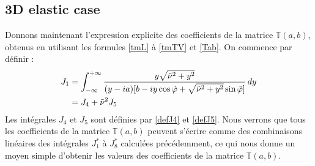 \subsection{3D elastic case}
\label{finalT3D}
Donnons maintenant l'expression explicite des coefficients de la matrice $\mathbb{T}(a,b)$, obtenus en utilisant les formules \eqref{tmL} à \eqref{tmTV} et \eqref{Tab}. 
On commence par définir :
\begin{equation}
\begin{split}
J_1&=\int_{-\infty}^{+\infty}\frac{y\sqrt{\tilde{\nu}^2+y^2}}{(y-ia)\lbrack b-iy\cos\tilde{\varphi}+\sqrt{\tilde{\nu}^2+y^2}\sin\tilde{\varphi}\rbrack}\,dy\\
&=J_4+\tilde{\nu}^2J_5
\end{split}
\label{defJ1}
\end{equation}
Les intégrales $J_4$ et $J_5$ sont définies par \eqref{defJ4} et \eqref{defJ5}.
Nous verrons que tous les coefficients de la matrice $\mathbb{T}(a,b)$ peuvent s'écrire comme des combinaisons linéaires des intégrales $J_1^*$ à $J_8^*$ calculées précédemment, ce qui nous donne un moyen simple d'obtenir les valeurs des coefficients de la matrice $\mathbb{T}(a,b)$.
